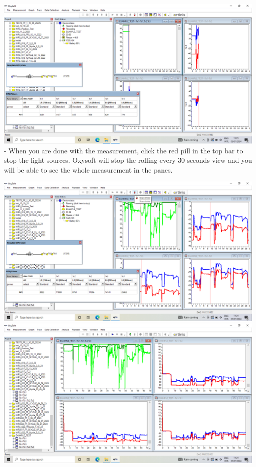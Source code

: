 \documentclass[
]{book}
\begin{document}
\includegraphics[width=1\linewidth]{images/startnewmeasurement/new_measurement_begins}
- When you are done with the measurement, click the red pill in the top bar to stop the light sources. Oxysoft will stop the rolling every 30 seconds view and you will be able to see the whole measurement in the panes.

\includegraphics[width=1\linewidth]{images/startnewmeasurement/select_end_measurement}
\includegraphics[width=1\linewidth]{images/startnewmeasurement/view_whole_measurement}
\end{document}

